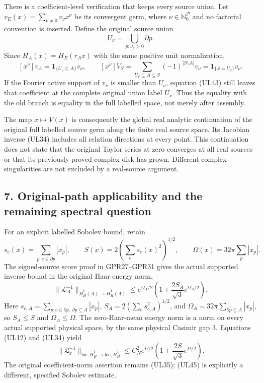 \documentclass[11pt]{article}
\begin{document}
There is a coefficient-level verification that keeps every source union. Let \(v_E(x)=\sum_{\nu\ne0}v_\nu x^\nu\) be its convergent germ, where \(\nu\in\mathbb N_0^{\mathcal P}\) and no factorial convention is inserted. Define the original source union
\[
 U_\nu=\bigcup_{p:\nu_p>0}\partial p.
 \tag{UL42}
\]
Since \(H_A(x)=H_E(r_Ax)\) with the same positive unit normalization,
\[
 [x^\nu]v_A
 =\mathbf1_{\{U_\nu\subseteq A\}}v_\nu,\qquad
 \boxed{[x^\nu]V_S
 =\sum_{U_\nu\subseteq A\subseteq S}
             (-1)^{|S\setminus A|}v_\nu
 =\mathbf1_{\{S=U_\nu\}}v_\nu.}
 \tag{UL43}
\]
If the Fourier active support of \(v_\nu\) is smaller than \(U_\nu\), equation (UL43) still leaves that coefficient at the complete original union label \(U_\nu\). Thus the equality with the old branch is equality in the full labelled space, not merely after assembly.

The map \(x\mapsto V(x)\) is consequently the global real analytic continuation of the original full labelled source germ along the finite real source space. Its Jacobian inverse (UL34) includes all relation directions at every point. This continuation does not state that the original Taylor series at zero converges at all real sources or that its previously proved complex disk has grown. Different complex singularities are not excluded by a real-source argument.

\subsection*{7. Original-path applicability and the remaining spectral question}

For an explicit labelled Sobolev bound, retain
\[
 s_e(x)=\sum_{p:e\in\partial p}|x_p|,\qquad
 S(x)=2\left(\sum_es_e(x)^2\right)^{1/2},\qquad
 \Omega(x)=32\pi\sum_p|x_p|.
 \tag{UL44}
\]
The signed-source score proof in GPR27–GPR31 gives the actual supported inverse bound in the original Haar energy norm,
\[
 \|\mathscr L_A^{-1}\|_{\dot H^1_H(A)\to\dot H^1_H(A)}
 \le e^{\Omega_A/2}
       \left(1+\frac{2S_A}{\sqrt3}e^{\Omega_A/2}\right).
\]
Here \(s_{e,A}=\sum_{p:e\in\partial p,\ \partial p\subseteq A}|x_p|\), \(S_A=2(\sum_es_{e,A}^2)^{1/2}\), and \(\Omega_A=32\pi\sum_{\partial p\subseteq A}|x_p|\), so \(S_A\le S\) and \(\Omega_A\le\Omega\). The zero-Haar-mean energy norm is a norm on every actual supported physical space, by the same physical Casimir gap \(3\). Equations (UL12) and (UL34) yield
\[
 \boxed{\|\mathfrak L_x^{-1}\|_{\mathrm{loc},\dot H^1_H\to
                                      \mathrm{loc},\dot H^1_H}
 \le C_N^2e^{\Omega/2}
       \left(1+\frac{2S}{\sqrt3}e^{\Omega/2}\right).}
 \tag{UL45}
\]
The original coefficient-norm assertion remains (UL35); (UL45) is explicitly a different, specified Sobolev estimate.
\end{document}

